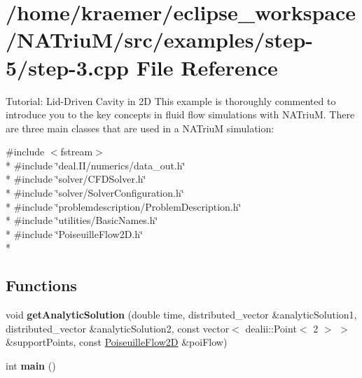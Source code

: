 \hypertarget{step-3_8cpp}{\section{/home/kraemer/eclipse\-\_\-workspace/\-N\-A\-Triu\-M/src/examples/step-\/5/step-\/3.cpp File Reference}
\label{step-3_8cpp}
}


Tutorial\-: Lid-\/\-Driven Cavity in 2\-D This example is thoroughly commented to introduce you to the key concepts in fluid flow simulations with N\-A\-Triu\-M. There are three main classes that are used in a N\-A\-Triu\-M simulation\-:  


{\ttfamily \#include $<$fstream$>$}\\*
{\ttfamily \#include \char`\"{}deal.\-I\-I/numerics/data\-\_\-out.\-h\char`\"{}}\\*
{\ttfamily \#include \char`\"{}solver/\-C\-F\-D\-Solver.\-h\char`\"{}}\\*
{\ttfamily \#include \char`\"{}solver/\-Solver\-Configuration.\-h\char`\"{}}\\*
{\ttfamily \#include \char`\"{}problemdescription/\-Problem\-Description.\-h\char`\"{}}\\*
{\ttfamily \#include \char`\"{}utilities/\-Basic\-Names.\-h\char`\"{}}\\*
{\ttfamily \#include \char`\"{}Poiseuille\-Flow2\-D.\-h\char`\"{}}\\*
\subsection*{Functions}
\begin{DoxyCompactItemize}
\item 
\hypertarget{step-3_8cpp_a34a3c1505f1afc2a3d8186abd7b11475}{void {\bfseries get\-Analytic\-Solution} (double time, distributed\-\_\-vector \&analytic\-Solution1, distributed\-\_\-vector \&analytic\-Solution2, const vector$<$ dealii\-::\-Point$<$ 2 $>$ $>$ \&support\-Points, const \hyperlink{classnatrium_1_1PoiseuilleFlow2D}{Poiseuille\-Flow2\-D} \&poi\-Flow)}\label{step-3_8cpp_a34a3c1505f1afc2a3d8186abd7b11475}

\item 
\hypertarget{step-3_8cpp_ae66f6b31b5ad750f1fe042a706a4e3d4}{int {\bfseries main} ()}\label{step-3_8cpp_ae66f6b31b5ad750f1fe042a706a4e3d4}

\end{DoxyCompactItemize}



